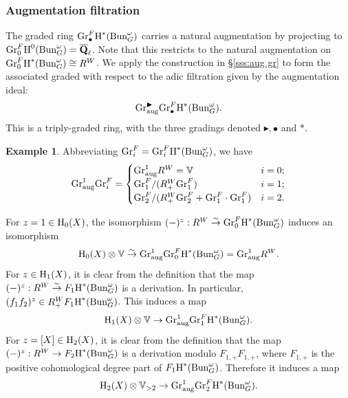 \documentclass[reqno]{amsart}
\numberwithin{equation}{subsection}
\theoremstyle{definition}
\newtheorem{exam}[subsubsection]{Example}
\def\VV{\mathbb{V}}
\newcommand{\Bun}{\textup{Bun}}
\newcommand{\Gr}{\textup{Gr}}
\newcommand{\Qlbar}{\overline{\Q}_\ell}
\newcommand{\bu}{\bullet}
\newcommand\ot{\otimes}
\newcommand{\homog}[2]{\textup{H}_{#1}({#2})}  %
\newcommand{\cohog}[2]{\textup{H}^{#1}({#2})}     %
\newcommand{\isom}{\stackrel{\sim}{\to}}
\newcommand{\om}{\omega}
\newcommand\aug{\textup{aug}}
\newcommand\bl{\blacktriangleright}
\newcommand{\Q}{\mathbf{Q}}
\begin{document}
\subsubsection{Augmentation filtration}\label{sss:aug fil} The graded ring $\Gr^{F}_{\bu}\cohog{*}{\Bun^{\om}_{G}}$ carries a natural augmentation by projecting to $\Gr^{F}_{0}\cohog{0}{\Bun^{\om}_{G}}=\Qlbar$. Note that this restricts to the natural augmentation on $\Gr^{F}_{0}\cohog{*}{\Bun^{\om}_{G}}\cong R^{W}$. We apply the construction in \S\ref{sss:aug gr} to form the associated graded with respect to the adic filtration given by the augmentation ideal:
\begin{equation*}
\Gr^{\bl}_{\aug}\Gr^{F}_{\bu}\cohog{*}{\Bun^{\om}_{G}}.
\end{equation*}
This is a triply-graded ring, with the three gradings denoted $\bl, \bu$ and $*$. 

\begin{exam} Abbreviating $\Gr^{F}_{i} = \Gr^{F}_{i}\cohog{*}{\Bun^{\om}_{G}}$, we have
\begin{equation*}
\Gr^{1}_{\aug}\Gr^{F}_{i}=\begin{cases}
\Gr^{1}_{\aug}R^{W}=\VV & i=0;\\
\Gr^{F}_{1}/(R^{W}_{+}\Gr^{F}_{1}) & i=1;\\ 
\Gr^{F}_{2}/(R^{W}_{+}\Gr^{F}_{2}+\Gr^{F}_{1}\cdot \Gr^{F}_{1}) & i=2.
\end{cases}
\end{equation*}
\end{exam}


For $z=1\in \homog{0}{X}$, the isomorphism $(-)^{z}: R^{W}\isom \Gr^{F}_{0}\cohog{*}{\Bun^{\om}_{G}}$ induces an isomorphism 
\begin{equation}\label{eq:ex-gr0map}
\homog{0}{X}\ot \VV\isom  \Gr^{1}_{\aug}\Gr^{F}_{0}\cohog{*}{\Bun^{\om}_{G}}=\Gr^{1}_{\aug}R^{W}.
\end{equation}
For $z\in \homog{1}{X}$, it is clear from the definition that the map $(-)^{z}: R^{W}\isom F_{1}\cohog{*}{\Bun^{\om}_{G}}$ is a derivation. In particular, $(f_{1}f_{2})^{z}\in R^{W}_{+}F_{1}\cohog{*}{\Bun^{\om}_{G}}$. This induces a map
\begin{equation}\label{eq:ex-gr1map}
\homog{1}{X}\ot \VV\to \Gr^{1}_{\aug}\Gr^{F}_{1}\cohog{*}{\Bun^{\om}_{G}}.
\end{equation}
For $z=[X]\in \homog{2}{X}$, it is clear from the definition that the map $(-)^{z}: R^{W}\to F_{2}\cohog{*}{\Bun^{\om}_{G}}$ is a derivation modulo $F_{1,+}F_{1,+}$, where $F_{1,+}$ is the positive cohomological degree part of $F_{1}\cohog{*}{\Bun^{\om}_{G}}$. Therefore it induces a map
\begin{equation}\label{eq:ex-gr2map}
\homog{2}{X}\ot \VV_{>2}\to \Gr^{1}_{\aug}\Gr^{F}_{2}\cohog{*}{\Bun^{\om}_{G}}.
\end{equation}
\end{document}
